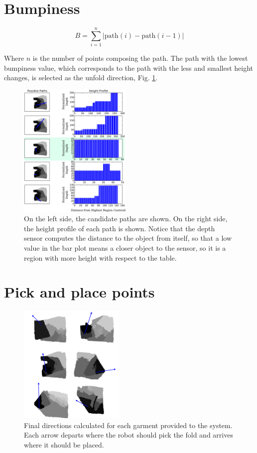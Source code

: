\section{Bumpiness}
\label{bumpiness}

\begin{equation}\label{bumpiness}
B = \sum_{i=1}^{n} | \textrm{path}(i)- \textrm{path}(i-1) | 
\end{equation}

Where $n$ is the number of points composing the path. The path with the lowest bumpiness value, which corresponds to the path with the less and smallest height changes, is selected as the unfold direction, Fig. \ref{fig:paths_with_bumpiness}.


\begin{figure}[thpb]
    \centering
    \includegraphics[width=0.48\textwidth]{figures/candidate_paths.pdf}
    \caption{On the left side, the candidate paths are shown. On the right side, the height profile of each path is shown. Notice that the depth sensor computes the distance to the object from itself, so that a low value in the bar plot means a closer object to the sensor, so it is a region with more height with respect to the table.}
    \label{fig:paths_with_bumpiness}
\end{figure}

\section{Pick and place points}
\label{pick_and_place}
\begin{figure}[thpb]
    \centering
    \includegraphics[width=0.45\textwidth]{figures/directions.pdf}
    \caption{Final directions calculated for each garment provided to the system. Each arrow departs where the robot should pick the fold and arrives where it should be placed.}
    \label{fig:directions}
\end{figure}